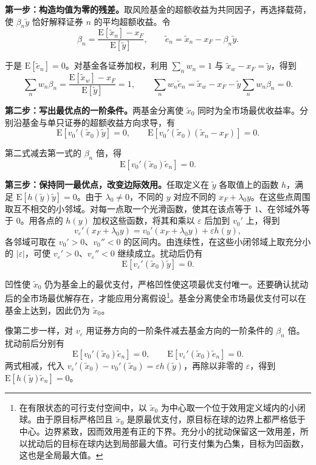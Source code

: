 \begin{solution}[label-content={证明},blank-type=none]
\textbf{第一步：构造均值为零的残差。}取风险基金的超额收益为共同因子，再选择载荷，使 $\beta_n\tilde y$ 恰好解释证券 $n$ 的平均超额收益。令
\[
 \beta_n=\frac{\mathrm E[\tilde x_n]-x_F}{\mathrm E[\tilde y]},\qquad
 \tilde e_n=\tilde x_n-x_F-\beta_n\tilde y.
\]

于是 $\mathrm E[\tilde e_n]=0$。对基金各证券加权，利用 $\sum_n w_n=1$ 与 $\tilde x_w-x_F=\tilde y$，得到
\[
 \sum_n w_n\beta_n
 =\frac{\mathrm E[\tilde x_w]-x_F}{\mathrm E[\tilde y]}=1,
 \qquad
 \sum_n w_n\tilde e_n
 =\tilde x_w-x_F-\tilde y\sum_nw_n\beta_n=0.
\]

\textbf{第二步：写出最优点的一阶条件。}两基金分离使 $\tilde x_0$ 同时为全市场最优收益率。分别沿基金与单只证券的超额收益方向求导，有
\[
 \mathrm E[v_0'(\tilde x_0)\tilde y]=0,\qquad
 \mathrm E[v_0'(\tilde x_0)(\tilde x_n-x_F)]=0.
\]

第二式减去第一式的 $\beta_n$ 倍，得
\[
 \mathrm E[v_0'(\tilde x_0)\tilde e_n]=0.
\]

\textbf{第三步：保持同一最优点，改变边际效用。}任取定义在 $\tilde y$ 各取值上的函数 $h$，满足 $\mathrm E[h(\tilde y)\tilde y]=0$。由于 $\lambda_0\ne0$，不同的 $y$ 对应不同的 $x_F+\lambda_0 y$。在这些点周围取互不相交的小邻域。对每一点取一个光滑函数，使其在该点等于 $1$、在邻域外等于 $0$。用各点的 $h(y)$ 加权这些函数，将其和乘以 $\varepsilon$ 后加到 $v_0'$ 上，得到
\[
 v_\varepsilon'(x_F+\lambda_0 y)
 =v_0'(x_F+\lambda_0 y)+\varepsilon h(y),
\]
各邻域可取在 $v_0'>0$、$v_0''<0$ 的区间内。由连续性，在这些小闭邻域上取充分小的 $\lvert\varepsilon\rvert$，可使 $v_\varepsilon'>0$、$v_\varepsilon''<0$ 继续成立。扰动后仍有
\[
 \mathrm E[v_\varepsilon'(\tilde x_0)\tilde y]=0.
\]

凹性使 $\tilde x_0$ 仍为基金上的最优支付，严格凹性使这项最优支付唯一。还要确认扰动后的全市场最优解存在，才能应用分离假设\footnote{在有限状态的可行支付空间中，以 $\tilde x_0$ 为中心取一个位于效用定义域内的小闭球。由于原目标严格凹且 $\tilde x_0$ 是原最优支付，原目标在球的边界上都严格低于中心。边界紧致，因而效用差有正的下界。充分小的扰动保留这一效用差，所以扰动后的目标在球内达到局部最大值。可行支付集为凸集，目标为凹函数，这也是全局最大值。}。基金分离使全市场最优支付可以在基金上达到，因此仍为 $\tilde x_0$。

像第二步一样，对 $v_\varepsilon$ 用证券方向的一阶条件减去基金方向的一阶条件的 $\beta_n$ 倍。扰动前后分别有
\[
 \mathrm E[v_0'(\tilde x_0)\tilde e_n]=0,\qquad
 \mathrm E[v_\varepsilon'(\tilde x_0)\tilde e_n]=0.
\]
两式相减，代入 $v_\varepsilon'(\tilde x_0)-v_0'(\tilde x_0)=\varepsilon h(\tilde y)$，再除以非零的 $\varepsilon$，得到 $\mathrm E[h(\tilde y)\tilde e_n]=0$。


\end{solution}
